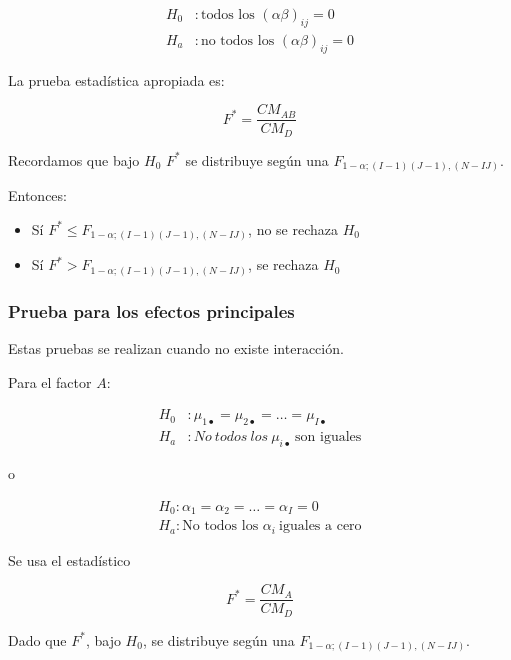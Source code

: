 \documentclass[]{book}
\theoremstyle{definition}
\theoremstyle{definition}
\theoremstyle{definition}
\theoremstyle{remark}
\begin{document}
\[
\begin{aligned}
H_{0}&: \text{todos los } \left( \alpha\beta \right)_{ij}  =  0\\
H_{a}&:\text{no todos los } \left( \alpha\beta \right)_{ij}  =  0
\end{aligned}
\]

La prueba estadística apropiada es:

\[
F^{*} = \frac{CM_{AB}}{CM_{D}}
\]

Recordamos que bajo \(H_{0}\) \(F^{*}\) se distribuye según una
\(F_{1 - \alpha;\left( I-1 \right)\left( J-1 \right),\left( N-IJ \right)}.\)

Entonces:

\begin{itemize}
\item
  Sí
  \(F^{*} \leq F_{1 - \alpha;\left( I-1 \right)\left( J-1 \right),\left( N-IJ \right)}\),
  no se rechaza \(H_{0}\)
\item
  Sí
  \(F^{*} > F_{1 - \alpha;\left( I-1 \right)\left( J-1 \right),\left( N-IJ \right)}\),
  se rechaza \(H_{0}\)
\end{itemize}

\hypertarget{prueba-para-los-efectos-principales}{%
\subsubsection{Prueba para los efectos
principales}\label{prueba-para-los-efectos-principales}}

Estas pruebas se realizan cuando no existe interacción.

Para el factor \(A\):

\[
\begin{aligned}
H_{0}&:\mu_{1 \bullet} = \mu_{2 \bullet} = \ldots = \mu_{I \bullet}\\
H_{a}&:No\ todos\ los\ \mu_{i \bullet}\ \text{son iguales}
\end{aligned}
\]

o

\[
\begin{aligned}
H_{0}:\alpha_{1} = \alpha_{2} = \ldots = \alpha_{I} = 0\\
H_{a}: \text{No todos los } \alpha_{i}\ \text{iguales a cero}
\end{aligned}
\]

Se usa el estadístico

\[
F^{*} = \frac{CM_{A}}{CM_{D}}
\]

Dado que \(F^{*}\), bajo \(H_{0}\), se distribuye según una
\(F_{1 - \alpha;\left( I-1 \right)\left( J-1 \right),\left( N-IJ \right)}.\)
\end{document}
